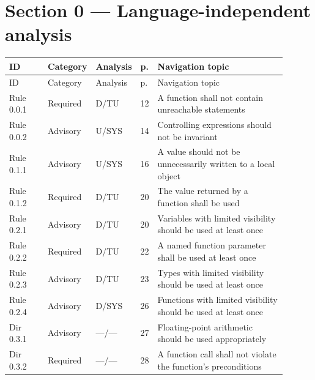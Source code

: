 \documentclass[10pt,letterpaper]{article}
\begin{document}
\section{Section 0 --- Language-independent analysis}
\small\setlength{\tabcolsep}{3pt}\renewcommand{\arraystretch}{1.15}
\begin{longtable}{p{0.14\linewidth}p{0.14\linewidth}p{0.1\linewidth}p{0.045\linewidth}p{0.475\linewidth}}
\toprule
ID & Category & Analysis & p. & Navigation topic\\ \midrule
\endfirsthead
\toprule
ID & Category & Analysis & p. & Navigation topic\\ \midrule
\endhead
Rule 0.0.1 & Required & D/TU & 12 & A function shall not contain unreachable statements\\
Rule 0.0.2 & Advisory & U/SYS & 14 & Controlling expressions should not be invariant\\
Rule 0.1.1 & Advisory & U/SYS & 16 & A value should not be unnecessarily written to a local object\\
Rule 0.1.2 & Required & D/TU & 20 & The value returned by a function shall be used\\
Rule 0.2.1 & Advisory & D/TU & 20 & Variables with limited visibility should be used at least once\\
Rule 0.2.2 & Required & D/TU & 22 & A named function parameter shall be used at least once\\
Rule 0.2.3 & Advisory & D/TU & 23 & Types with limited visibility should be used at least once\\
Rule 0.2.4 & Advisory & D/SYS & 26 & Functions with limited visibility should be used at least once\\
Dir 0.3.1 & Advisory & ---/--- & 27 & Floating-point arithmetic should be used appropriately\\
Dir 0.3.2 & Required & ---/--- & 28 & A function call shall not violate the function's preconditions\\
\bottomrule
\end{longtable}
\normalsize
\end{document}
